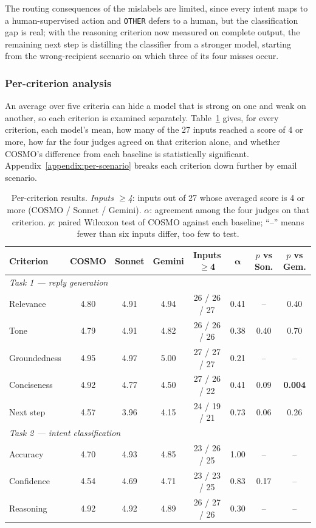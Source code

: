 \documentclass[a4paper]{article}
\begin{document}
The routing consequences of the mislabels are limited, since every intent maps
to a human-supervised action and \texttt{OTHER} defers to a human, but the
classification gap is real; with the reasoning criterion now measured on
complete output, the remaining next step is distilling the classifier from a
stronger model, starting from the wrong-recipient scenario on which three of
its four misses occur.

\subsubsection{Per-criterion analysis}
\label{sec:per-criterion}
An average over five criteria can hide a model that is strong on one and weak
on another, so each criterion is examined separately.
Table~\ref{tab:per-criterion} gives, for every criterion, each model's mean, how
many of the 27 inputs reached a score of 4 or more, how far the four judges
agreed on that criterion alone, and whether COSMO's difference from each
baseline is statistically significant. Appendix~\ref{appendix:per-scenario}
breaks each criterion down further by email scenario.

\begin{table}[H]
\centering
\caption{Per-criterion results. \emph{Inputs $\geq$4}: inputs out of 27 whose
averaged score is 4 or more (COSMO / Sonnet / Gemini). $\alpha$: agreement
among the four judges on that criterion. $p$: paired Wilcoxon test of COSMO
against each baseline; ``--'' means fewer than six inputs differ, too few to
test.}
\label{tab:per-criterion}
\small
\begin{tabular}{lccccccc}
\toprule
\textbf{Criterion} & \textbf{COSMO} & \textbf{Sonnet} & \textbf{Gemini} &
\textbf{Inputs $\geq$4} & $\boldsymbol{\alpha}$ & \textbf{$p$ vs Son.} &
\textbf{$p$ vs Gem.} \\
\midrule
\multicolumn{8}{l}{\emph{Task 1 --- reply generation}} \\
Relevance    & 4.80 & 4.91 & 4.94 & 26 / 26 / 27 & 0.41 & --    & 0.40 \\
Tone         & 4.79 & 4.91 & 4.82 & 26 / 26 / 26 & 0.38 & 0.40  & 0.70 \\
Groundedness & 4.95 & 4.97 & 5.00 & 27 / 27 / 27 & 0.21 & --    & --   \\
Conciseness  & 4.92 & 4.77 & 4.50 & 27 / 26 / 22 & 0.41 & 0.09  & \textbf{0.004} \\
Next step    & 4.57 & 3.96 & 4.15 & 24 / 19 / 21 & 0.73 & 0.06  & 0.26 \\
\midrule
\multicolumn{8}{l}{\emph{Task 2 --- intent classification}} \\
Accuracy     & 4.70 & 4.93 & 4.85 & 23 / 26 / 25 & 1.00 & --    & --   \\
Confidence   & 4.54 & 4.69 & 4.71 & 23 / 23 / 25 & 0.83 & 0.17  & --   \\
Reasoning    & 4.92 & 4.92 & 4.89 & 26 / 27 / 26 & 0.30 & --    & --   \\
\bottomrule
\end{tabular}
\end{table}
\end{document}
